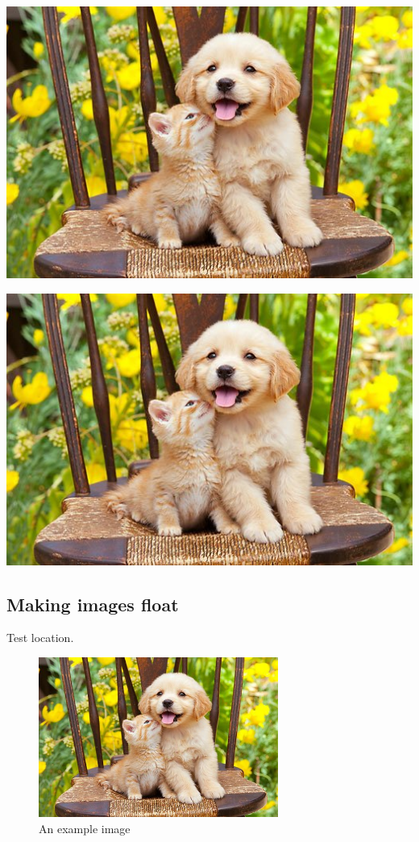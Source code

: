 \documentclass{article}
\begin{document}
\begin{center}
 \includegraphics[scale=0.6,angle=20]{pic}
 \end{center}


\begin{center}
 \includegraphics[clip, trim = 50 25 50 30]{pic}
 \end{center}

 \subsection{ Making images float}

\lipsum[1-4] %
 Test location.
 \begin{figure}[ht]
 \centering
 \includegraphics[width=0.7\textwidth]{pic.jpg}
 \caption{An example image}

 \end{figure}
 \lipsum[6-10] %
\end{document}
